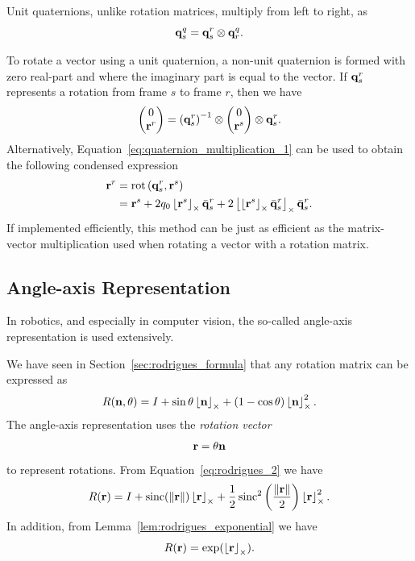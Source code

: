 Unit quaternions, unlike rotation matrices, multiply from left to
right, as 
\[
\mathbf{q}_{s}^{q}=\mathbf{q}_{s}^{r}\otimes\mathbf{q}_{r}^{q}.
\]

To rotate a vector using a unit quaternion, a non-unit quaternion is formed with zero real-part and where the imaginary part is equal to the vector.  If $\mathbf{q}_s^r$ represents a rotation from frame $s$ to frame $r$, then we have 
\begin{equation}
\begin{pmatrix} 0 \\ \rbf^{r}\end{pmatrix}=\left(\qbf_{s}^{r}\right)^{-1}\otimes\begin{pmatrix}0\\
\rbf^{s}
\end{pmatrix}\otimes\qbf_{s}^{r}.\label{eq:quat_rotation}
\end{equation}
Alternatively, Equation~\eqref{eq:quaternion_multiplication_1} can be used to obtain the following condensed expression
\begin{align*}
\mathbf{r}^{r} & =\text{rot} \left(\mathbf{q}_{s}^{r},\mathbf{r}^{s}\right)\\
 & =\mathbf{r}^s + 2q_0\left\lfloor\mathbf{r}^s\right\rfloor_{\times}\bar{\mathbf{q}}_s^r+2\left\lfloor\left\lfloor\mathbf{r}^s\right\rfloor_{\times}\bar{\mathbf{q}}_s^r\right\rfloor_{\times}\bar{\mathbf{q}}_s^r.
\end{align*}
If implemented efficiently, this method can be just as efficient as
the matrix-vector multiplication used when rotating a vector with
a rotation matrix.


\subsection{Angle-axis Representation}
In robotics, and especially in computer vision, the so-called angle-axis representation is used extensively.  

We have seen in Section~\ref{sec:rodrigues_formula} that any rotation matrix can be expressed as
\[
R(\mathbf{n},\theta) = I + \sin\theta\left\lfloor\mathbf{n}\right\rfloor_{\times} + (1-\cos\theta)\left\lfloor\mathbf{n}\right\rfloor_{\times}^2.  
\]
The angle-axis representation uses the {\em rotation vector}
\[
\mathbf{r} = \theta\mathbf{n}
\]
to represent rotations.  From Equation~\eqref{eq:rodrigues_2} we have
\begin{align}
R(\mathbf{r}) = I + \operatorname{sinc}(\left\|\mathbf{r}\right\|)\left\lfloor\mathbf{r}\right\rfloor_{\times} + \frac{1}{2}\operatorname{sinc}^2\left(\frac{\left\|\mathbf{r}\right\|}{2}\right)\left\lfloor\mathbf{r}\right\rfloor_{\times}^2.
\end{align}
In addition, from Lemma~\ref{lem:rodrigues_exponential} we have
\[
R(\mathbf{r}) = \exp(\left\lfloor\mathbf{r}\right\rfloor_{\times}).
\]

